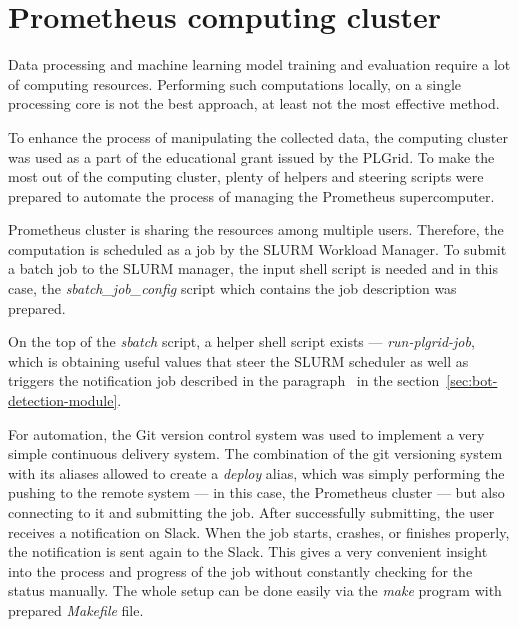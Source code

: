 \section{Prometheus computing cluster}\label{sec:prometheus-computing-cluster}
Data processing and machine learning model training and evaluation require a lot of computing resources.
Performing such computations locally, on a single processing core is not the best approach, at least not the most effective method.

To enhance the process of manipulating the collected data, the computing cluster was used as a part of the educational grant issued by the PLGrid.
To make the most out of the computing cluster, plenty of helpers and steering scripts were prepared to automate the process of managing the Prometheus supercomputer.

Prometheus cluster is sharing the resources among multiple users.
Therefore, the computation is scheduled as a job by the SLURM Workload Manager.
To submit a batch job to the SLURM manager, the input shell script is needed and in this case, the \textit{sbatch\_job\_config} script which contains the job description was prepared.

On the top of the \textit{sbatch} script, a helper shell script exists --- \textit{run-plgrid-job}, which is obtaining useful values that steer the SLURM scheduler as well as triggers the notification job described in the paragraph~ in the section~\ref{sec:bot-detection-module}.

For automation, the Git version control system was used to implement a very simple continuous delivery system.
The combination of the git versioning system with its aliases allowed to create a \textit{deploy} alias, which was simply performing the pushing to the remote system --- in this case, the Prometheus cluster --- but also connecting to it and submitting the job.
After successfully submitting, the user receives a notification on Slack.
When the job starts, crashes, or finishes properly, the notification is sent again to the Slack.
This gives a very convenient insight into the process and progress of the job without constantly checking for the status manually.
The whole setup can be done easily via the \textit{make} program with prepared \textit{Makefile} file.
